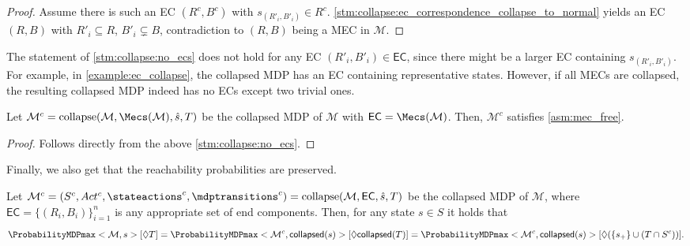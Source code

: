 \documentclass{article}
\newcommand{\unionSym}{\cup}
\newcommand{\unionBin}{\mathbin{\unionSym}}
\newcommand{\intersectionSym}{\cap}
\newcommand{\intersectionBin}{\mathbin{\intersectionSym}}
\newcommand{\union}{\unionBin}
\newcommand{\intersection}{\intersectionBin}
\newcommand{\MDP}{\mathcal{M}}
\newcommand{\States}{S}
\newcommand{\initialstate}{\hat{s}}
\newcommand{\Actions}{Act}
\newcommand{\reach}{\Diamond}
\newcommand{\targetstate}{s_+}
\newcommand{\targetset}{T}
\DeclareMathOperator{\collapse}{collapse}
\newcommand{\eccollapsed}{\mathsf{collapsed}}
\newcommand{\algoecs}{\mathsf{EC}}
\begin{document}
\begin{proof}
	Assume there is such an EC $(R^c, B^c)$ with $s_{(R'_i, B'_i)} \in R^c$.
	\cref{stm:collapse:ec_correspondence_collapse_to_normal} yields an EC $(R, B)$ with $R'_i \subseteq R$, $B'_i \subsetneq B$, contradiction to $(R, B)$ being a MEC in $\MDP$. 
\end{proof}
The statement of \cref{stm:collapse:no_ecs} does not hold for any EC $(R'_i, B'_i) \in \algoecs$, since there might be a larger EC containing $s_{(R'_i, B'_i)}$.
For example, in \cref{example:ec_collapse}, the collapsed MDP has an EC containing representative states.
However, if all MECs are collapsed, the resulting collapsed MDP indeed has no ECs except two trivial ones.
\begin{corollary}
	Let $\MDP^c = \collapse(\MDP, \Mecs(\MDP), \initialstate, \targetset)$ be the collapsed MDP of $\MDP$ with $\algoecs = \Mecs(\MDP)$.
	Then, $\MDP^c$ satisfies \cref{asm:mec_free}.
\end{corollary}

\begin{proof}
	Follows directly from the above \cref{stm:collapse:no_ecs}. 
\end{proof}
Finally, we also get that the reachability probabilities are preserved.
\begin{lemma} \label{stm:collapse:reachability_equal}
	Let $\MDP^c = (\States^c, \Actions^c, \stateactions^c, \mdptransitions^c) = \collapse(\MDP, \algoecs, \initialstate, \targetset)$ be the collapsed MDP of $\MDP$, where $\algoecs = \{(R_i,B_i)\}_{i=1}^n$ is any appropriate set of end components.
	Then, for any state $s \in \States$ it holds that
	\begin{equation*}
		\ProbabilityMDPmax<\MDP, s>[\reach \targetset] = \ProbabilityMDPmax<\MDP^c, \eccollapsed(s)>[\reach \eccollapsed(\targetset)] = \ProbabilityMDPmax<\MDP^c, \eccollapsed(s)>[\reach (\{\targetstate\} \union (\targetset \intersection \States^c))].
	\end{equation*}
\end{lemma}
\end{document}
